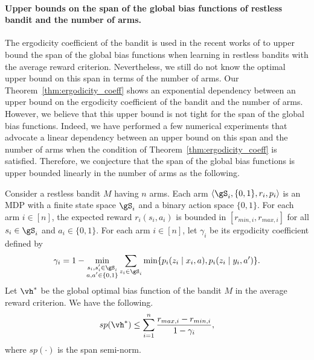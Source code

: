 \paragraph{Upper bounds on the span of the global bias functions of restless bandit and the number of arms.}
The ergodicity coefficient of the bandit is used in the recent works of \cite{akbarzadeh2022learning, xiong2022learning} to upper bound the span of the global bias functions when learning in restless bandits with the average reward criterion.
Nevertheless, we still do not know the optimal upper bound on this span in terms of the number of arms. 
Our Theorem~\ref{thm:ergodicity_coeff} shows an exponential dependency between an upper bound on the ergodicity coefficient of the bandit and the number of arms.
However, we believe that this upper bound is not tight for the span of the global bias functions.
Indeed, we have performed a few numerical experiments that advocate a linear dependency between an upper bound on this span and the number of arms when the condition of Theorem~\ref{thm:ergodicity_coeff} is satisfied.
Therefore, we conjecture that the span of the global bias functions is upper bounded linearly in the number of arms as the following.
\begin{conj}
    \label{conj:span}
    Consider a restless bandit $M$ having $n$ arms.
    Each arm $\langle\gS_i,\{0,1\},r_i,p_i\rangle$ is an MDP with a finite state space $\gS_i$ and a binary action space $\{0,1\}$.
    For each arm $i\in[n]$, the expected reward $r_i(s_i,a_i)$ is bounded in $[r_{min,i},r_{max,i}]$ for all $s_i\in\gS_i$ and $a_i\in\{0,1\}$.
    For each arm $i\in[n]$, let $\gamma_i$ be its ergodicity coefficient defined by
    \begin{align*}
        \gamma_i = 1-\min_{\substack{s_i,s'_i\in\gS_i \\a,a'\in\{0,1\}}} \sum_{z_i\in\gS_i} \min\{p_i(z_i \mid x_i, a), p_i(z_i \mid y_i, a')\}.
    \end{align*}
    Let $\vh^*$ be the global optimal bias function of the bandit $M$ in the average reward criterion.
    We have the following.
    \begin{align*}
        sp(\vh^*) \le \sum_{i=1}^n\frac{r_{max,i}-r_{min,i}}{1-\gamma_i},
    \end{align*}
    where $sp(\cdot)$ is the span semi-norm.
\end{conj}


